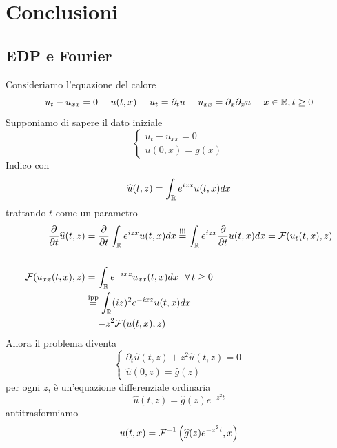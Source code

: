 \chapter{Conclusioni}

\section{EDP e Fourier}

Consideriamo l'equazione del calore
\begin{equation*}
u_{t} - u_{xx} = 0\ \ \ \ u(t, x) \ \ \ \ u_{t} = \partial_{t} u\ \ \ \ u_{xx} = \partial_{x} \partial_{x} u\ \ \ \ x\in \mathbb{R}, t \geq 0
\end{equation*}
Supponiamo di sapere il dato iniziale
\begin{equation*}
\begin{cases}
u_{t} - u_{xx} = 0\\
u(0, x) = g(x)
\end{cases}
\end{equation*}
Indico con
\begin{equation*}
\widehat{u}(t, z) = \int_{\mathbb{R}} e^{izx} u(t, x) dx
\end{equation*}
trattando $t$ come un parametro
\begin{align*}
\frac{\partial}{\partial t}\hat{u}(t, z) & = \frac{\partial}{\partial t}\int_{\RR} e^{izx} u(t, x) dx\overset{!!!}{=}\int_{\RR} e^{izx}\frac{\partial}{\partial t} u(t, x) dx = \Fc(u_{t}(t, x), z)\\
 & \\
\Fc(u_{xx}(t, x), z) & = \int_{\RR} e^{- ixz} u_{xx}(t, x) dx\ \ \forall t \geq 0\\
 & \overset{\text{ipp}}{=}\int_{\RR}(iz)^{2} e^{- ixz} u(t, x) dx\\
 & = - z^{2}\Fc(u(t, x), z)
\end{align*}
Allora il problema diventa
\begin{equation*}
\begin{cases}
\partial_{t}\hat{u}(t, z) + z^{2}\hat{u}(t, z) = 0\\
\hat{u}(0, z) = \hat{g}(z)
\end{cases}
\end{equation*}
per ogni $z$, è un'equazione differenziale ordinaria
\begin{equation*}
\hat{u}(t, z) = \hat{g}(z) e^{- z^{2} t}
\end{equation*}
antitrasformiamo
\begin{equation*}
u(t, x) = \mathcal{F}^{- 1}\left(\widehat{g}(z) e^{- z^{2} t}, x\right)
\end{equation*}
